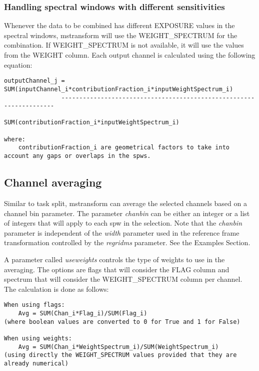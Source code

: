 \subsubsection{Handling spectral windows with different sensitivities}
Whenever the data to be combined has different EXPOSURE values in the spectral
windows, mstransform will use the WEIGHT\_SPECTRUM for the combination. If
WEIGHT\_SPECTRUM is not available, it will use the values from the WEIGHT
column. Each output channel is calculated using the following equation:

\begin{verbatim}
outputChannel_j = SUM(inputChannel_i*contributionFraction_i*inputWeightSpectrum_i) 
                --------------------------------------------------------------------
                        SUM(contributionFraction_i*inputWeightSpectrum_i)

where:
    contributionFraction_i are geometrical factors to take into account any gaps or overlaps in the spws.
\end{verbatim}

\subsection{Channel averaging}
Similar to task split, mstransform can average the selected channels based on a
channel bin parameter. The parameter {\it chanbin} can be either an integer or a list of
integers that will apply to each spw in the selection. Note that the {\it chanbin}
parameter is independent of the {\it width} parameter used in the reference frame
transformation controlled by the {\it regridms} parameter. See the Examples Section.

A parameter called {\it useweights} controls the type of weights to use in the
averaging. The options are flags that will consider the FLAG column and spectrum
that will consider the WEIGHT_SPECTRUM column per channel. The calculation is
done as follows:

\begin{verbatim}
When using flags:
    Avg = SUM(Chan_i*Flag_i)/SUM(Flag_i)     
(where boolean values are converted to 0 for True and 1 for False)

When using weights:
    Avg = SUM(Chan_i*WeightSpectrum_i)/SUM(WeightSpectrum_i)     
(using directly the WEIGHT_SPECTRUM values provided that they are already numerical)

\end{verbatim}

